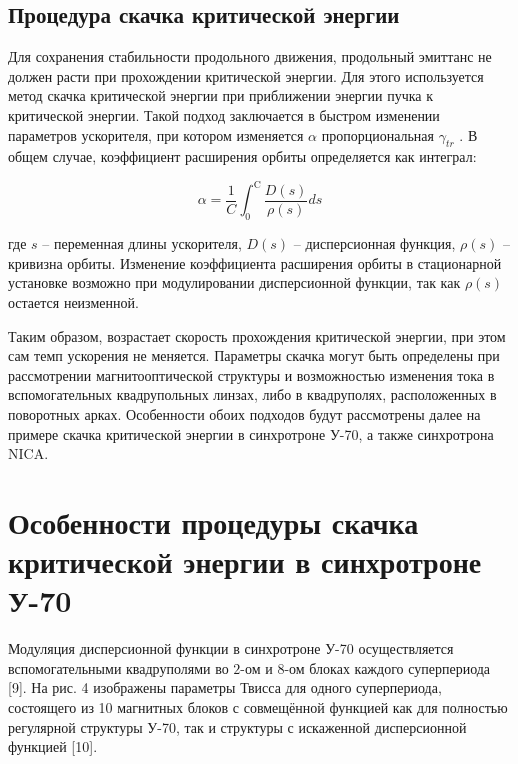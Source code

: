 \subsection{Процедура скачка критической энергии}

\par Для сохранения стабильности продольного движения, продольный эмиттанс не должен расти при прохождении критической энергии. Для этого используется метод скачка критической энергии при приближении энергии пучка к критической энергии. Такой подход заключается в быстром изменении параметров ускорителя, при котором изменяется $\alpha$ пропорциональная $\gamma_{tr}$ . В общем случае, коэффициент расширения орбиты определяется как интеграл:

\begin{equation}
\alpha=\frac{1}{C} \int_0^{\mathrm{C}} \frac{D(s)}{\rho(s)} d s
\label{eq:alpha_general}
\end{equation}

\noindent где $s$ -- переменная длины ускорителя, $D\left(s\right)$ -- дисперсионная функция, $\rho\left(s\right)$ -- кривизна орбиты. Изменение коэффициента расширения орбиты в стационарной установке возможно при модулировании дисперсионной функции, так как $\rho\left(s\right)$ остается неизменной. 

\par Таким образом, возрастает скорость прохождения критической энергии, при этом сам темп ускорения не меняется. Параметры скачка могут быть определены при рассмотрении магнитооптической структуры и возможностью изменения тока в вспомогательных квадрупольных линзах, либо в квадруполях, расположенных в поворотных арках. Особенности обоих подходов будут рассмотрены далее на примере скачка критической энергии в синхротроне У-70, а также синхротрона NICA.

\section{Особенности процедуры скачка критической энергии в синхротроне У-70}

\par Модуляция дисперсионной функции в синхротроне У-70 осуществляется вспомогательными квадруполями во $2$-ом и $8$-ом блоках каждого суперпериода [9]. На рис. 4 изображены параметры Твисса для одного суперпериода, состоящего из 10 магнитных блоков с совмещённой функцией как для полностью регулярной структуры У-70, так и структуры с искаженной дисперсионной функцией [10].


